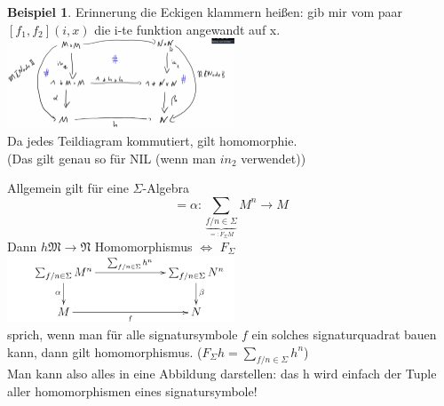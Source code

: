 \documentclass{article}
\theoremstyle{definition}
\newtheorem{beispiel}{Beispiel}[section]
\begin{document}
\begin{beispiel}
	Erinnerung die Eckigen klammern heißen: gib mir vom paar $[f_1, f_2](i,x)$ die i-te funktion angewandt auf x.\\
	\includegraphics[width=256px]{images/kommutationTree.png}\\
	Da jedes Teildiagram kommutiert, gilt homomorphie.\\
	(Das gilt genau so für NIL (wenn man $in_2$ verwendet))\\
	\end{beispiel}
	Allgemein gilt für eine $\Sigma$-Algebra 
	\[= \alpha:\sum_{\underbrace{f/n\in\Sigma}_{=: F_\Sigma M}} M^n\to M\]
	Dann $h\mathfrak{M}\to\mathfrak{N}$ Homomorphismus $\iff$ $F_\Sigma$\\
	\includegraphics[width=256px]{images/allgHomomorphismus.png}\\
	sprich, wenn man für alle signatursymbole $f$ ein solches signaturquadrat bauen kann, dann gilt homomorphismus. ($F_\Sigma h=\sum_{f/n\in\Sigma} h^n$)\\
	Man kann also alles in eine Abbildung darstellen: das h wird einfach der Tuple aller homomorphismen eines signatursymbole!
\end{document}
